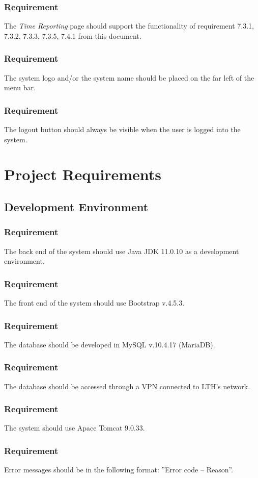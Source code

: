 \documentclass{article}
\begin{document}
\subsubsection{Requirement}
The \textit{Time Reporting} page should support the functionality of requirement 7.3.1, 7.3.2, 7.3.3, 7.3.5, 7.4.1 from this document.

\subsubsection{Requirement}
The system logo and/or the system name should be placed on the far left
of the menu bar.

\subsubsection{Requirement}
The logout button should always be visible when the user is logged into the system. 

\section{Project Requirements}
\subsection{Development Environment}

\subsubsection{Requirement}
The back end of the system should use Java JDK 11.0.10 as a development environment.

\subsubsection{Requirement}
The front end of the system should use Bootstrap v.4.5.3.

\subsubsection{Requirement}
The database should be developed in MySQL v.10.4.17 (MariaDB).

\subsubsection{Requirement}
The database should be accessed through a VPN connected to LTH's network.

\subsubsection{Requirement}
The system should use Apace Tomcat 9.0.33.

\subsubsection{Requirement}
Error messages should be in the following format: ”Error code – Reason”.
\end{document}
